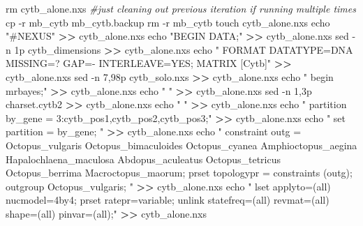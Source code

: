 \documentclass[
]{article}
\newenvironment{Shaded}{\begin{snugshade}}{\end{snugshade}}
\newcommand{\AttributeTok}[1]{\textcolor[rgb]{0.77,0.63,0.00}{#1}}
\newcommand{\BuiltInTok}[1]{#1}
\newcommand{\CommentTok}[1]{\textcolor[rgb]{0.56,0.35,0.01}{\textit{#1}}}
\newcommand{\FunctionTok}[1]{\textcolor[rgb]{0.00,0.00,0.00}{#1}}
\newcommand{\NormalTok}[1]{#1}
\newcommand{\OperatorTok}[1]{\textcolor[rgb]{0.81,0.36,0.00}{\textbf{#1}}}
\newcommand{\StringTok}[1]{\textcolor[rgb]{0.31,0.60,0.02}{#1}}
\begin{document}
\begin{Shaded}
\begin{Highlighting}[]
\FunctionTok{rm}\NormalTok{ cytb\_alone.nxs }\CommentTok{\#just cleaning out previous iteration if running multiple times}
\FunctionTok{cp} \AttributeTok{{-}r}\NormalTok{ mb\_cytb mb\_cytb.backup}
\FunctionTok{rm} \AttributeTok{{-}r}\NormalTok{ mb\_cytb}
\FunctionTok{touch}\NormalTok{ cytb\_alone.nxs}
\BuiltInTok{echo} \StringTok{"\#NEXUS"} \OperatorTok{\textgreater{}\textgreater{}}\NormalTok{ cytb\_alone.nxs}
\BuiltInTok{echo} \StringTok{"BEGIN DATA;"} \OperatorTok{\textgreater{}\textgreater{}}\NormalTok{ cytb\_alone.nxs}
\FunctionTok{sed} \AttributeTok{{-}n}\NormalTok{ 1p cytb\_dimensions }\OperatorTok{\textgreater{}\textgreater{}}\NormalTok{ cytb\_alone.nxs}
\BuiltInTok{echo} \StringTok{"  FORMAT DATATYPE=DNA MISSING=? GAP={-} INTERLEAVE=YES;}
\StringTok{  MATRIX}
\StringTok{  }
\StringTok{  [Cytb]"} \OperatorTok{\textgreater{}\textgreater{}}\NormalTok{ cytb\_alone.nxs}
\FunctionTok{sed} \AttributeTok{{-}n}\NormalTok{ 7,98p cytb\_solo.nxs }\OperatorTok{\textgreater{}\textgreater{}}\NormalTok{ cytb\_alone.nxs}
\BuiltInTok{echo} \StringTok{"}
\StringTok{begin mrbayes;"} \OperatorTok{\textgreater{}\textgreater{}}\NormalTok{ cytb\_alone.nxs}
\BuiltInTok{echo} \StringTok{" "} \OperatorTok{\textgreater{}\textgreater{}}\NormalTok{ cytb\_alone.nxs}
\FunctionTok{sed} \AttributeTok{{-}n}\NormalTok{ 1,3p charset.cytb2 }\OperatorTok{\textgreater{}\textgreater{}}\NormalTok{ cytb\_alone.nxs}
\BuiltInTok{echo} \StringTok{" "} \OperatorTok{\textgreater{}\textgreater{}}\NormalTok{ cytb\_alone.nxs}
\BuiltInTok{echo} \StringTok{"      partition by\_gene = 3:cytb\_pos1,cytb\_pos2,cytb\_pos3;"} \OperatorTok{\textgreater{}\textgreater{}}\NormalTok{ cytb\_alone.nxs}
\BuiltInTok{echo} \StringTok{"      set partition = by\_gene;}
\StringTok{"} \OperatorTok{\textgreater{}\textgreater{}}\NormalTok{ cytb\_alone.nxs}
\BuiltInTok{echo} \StringTok{"      constraint outg = Octopus\_vulgaris Octopus\_bimaculoides Octopus\_cyanea Amphioctopus\_aegina Hapalochlaena\_maculosa Abdopus\_aculeatus Octopus\_tetricus Octopus\_berrima Macroctopus\_maorum;}
\StringTok{        prset topologypr = constraints (outg);}
\StringTok{        outgroup Octopus\_vulgaris;}
\StringTok{        "} \OperatorTok{\textgreater{}\textgreater{}}\NormalTok{ cytb\_alone.nxs}
\BuiltInTok{echo} \StringTok{"      lset applyto=(all)   nucmodel=4by4;}
\StringTok{        prset ratepr=variable;}
\StringTok{        unlink statefreq=(all) revmat=(all) shape=(all) pinvar=(all);"} \OperatorTok{\textgreater{}\textgreater{}}\NormalTok{ cytb\_alone.nxs}


\end{Highlighting}
\end{Shaded}
\end{document}
